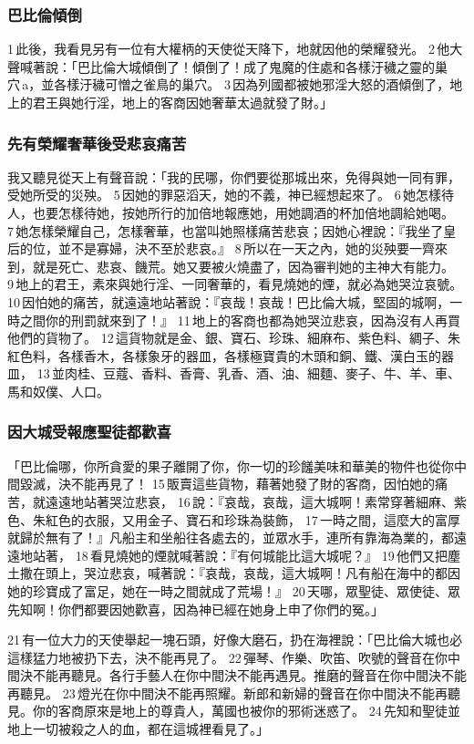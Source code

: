 \subsubsection{巴比倫傾倒}

1 此後，我看見另有一位有大權柄的天使從天降下，地就因他的榮耀發光。 2 他大聲喊著說：「巴比倫大城傾倒了！傾倒了！成了鬼魔的住處和各樣汙穢之靈的巢穴 a，並各樣汙穢可憎之雀鳥的巢穴。 3 因為列國都被她邪淫大怒的酒傾倒了，地上的君王與她行淫，地上的客商因她奢華太過就發了財。」

\subsubsection{先有榮耀奢華後受悲哀痛苦}
我又聽見從天上有聲音說：「我的民哪，你們要從那城出來，免得與她一同有罪，受她所受的災殃。 5 因她的罪惡滔天，她的不義，神已經想起來了。 6 她怎樣待人，也要怎樣待她，按她所行的加倍地報應她，用她調酒的杯加倍地調給她喝。 7 她怎樣榮耀自己，怎樣奢華，也當叫她照樣痛苦悲哀；因她心裡說：『我坐了皇后的位，並不是寡婦，決不至於悲哀。』 8 所以在一天之內，她的災殃要一齊來到，就是死亡、悲哀、饑荒。她又要被火燒盡了，因為審判她的主神大有能力。 9 地上的君王，素來與她行淫、一同奢華的，看見燒她的煙，就必為她哭泣哀號。 10 因怕她的痛苦，就遠遠地站著說：『哀哉！哀哉！巴比倫大城，堅固的城啊，一時之間你的刑罰就來到了！』 11 地上的客商也都為她哭泣悲哀，因為沒有人再買他們的貨物了。 12 這貨物就是金、銀、寶石、珍珠、細麻布、紫色料、綢子、朱紅色料，各樣香木，各樣象牙的器皿，各樣極寶貴的木頭和銅、鐵、漢白玉的器皿， 13 並肉桂、豆蔻、香料、香膏、乳香、酒、油、細麵、麥子、牛、羊、車、馬和奴僕、人口。

\subsubsection{因大城受報應聖徒都歡喜}
「巴比倫哪，你所貪愛的果子離開了你，你一切的珍饈美味和華美的物件也從你中間毀滅，決不能再見了！ 15 販賣這些貨物，藉著她發了財的客商，因怕她的痛苦，就遠遠地站著哭泣悲哀， 16 說：『哀哉，哀哉，這大城啊！素常穿著細麻、紫色、朱紅色的衣服，又用金子、寶石和珍珠為裝飾， 17 一時之間，這麼大的富厚就歸於無有了！』凡船主和坐船往各處去的，並眾水手，連所有靠海為業的，都遠遠地站著， 18 看見燒她的煙就喊著說：『有何城能比這大城呢？』 19 他們又把塵土撒在頭上，哭泣悲哀，喊著說：『哀哉，哀哉，這大城啊！凡有船在海中的都因她的珍寶成了富足，她在一時之間就成了荒場！』 20 天哪，眾聖徒、眾使徒、眾先知啊！你們都要因她歡喜，因為神已經在她身上申了你們的冤。」

21 有一位大力的天使舉起一塊石頭，好像大磨石，扔在海裡說：「巴比倫大城也必這樣猛力地被扔下去，決不能再見了。 22 彈琴、作樂、吹笛、吹號的聲音在你中間決不能再聽見。各行手藝人在你中間決不能再遇見。推磨的聲音在你中間決不能再聽見。 23 燈光在你中間決不能再照耀。新郎和新婦的聲音在你中間決不能再聽見。你的客商原來是地上的尊貴人，萬國也被你的邪術迷惑了。 24 先知和聖徒並地上一切被殺之人的血，都在這城裡看見了。」

